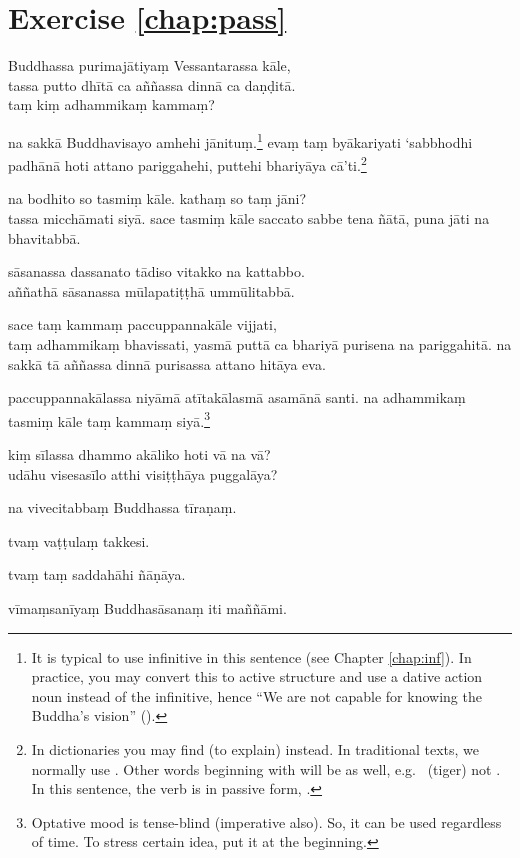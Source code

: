 \section*{Exercise \ref{chap:pass}}
\begin{answerkey}
\item Buddhassa purimaj\=atiya\d m Vessantarassa k\=ale, \\tassa putto dh\=it\=a ca a\~n\~nassa dinn\=a ca da\d n\d dit\=a. \\ta\d m ki\d m adhammika\d m kamma\d m?
\item na sakk\=a Buddhavisayo amhehi j\=anitu\d m.\footnote{It is typical to use infinitive in this sentence (see Chapter \ref{chap:inf}). In practice, you may convert this to active structure and use a dative action noun instead of the infinitive, hence ``We are not capable for knowing the Buddha's vision'' ().} eva\d m ta\d m by\=akariyati `sabbhodhi padh\=an\=a hoti attano pariggahehi, puttehi bhariy\=aya c\=a'ti.\footnote{In dictionaries you may find  (to explain) instead. In traditional texts, we normally use . Other words beginning with  will be  as well, e.g.\  (tiger) not . In this sentence, the verb is in passive form, .}
\item na bodhito so tasmi\d m k\=ale. katha\d m so ta\d m j\=ani? \\tassa micch\=amati siy\=a. sace tasmi\d m k\=ale saccato sabbe tena \~n\=at\=a, puna j\=ati na bhavitabb\=a.
\item s\=asanassa dassanato t\=adiso vitakko na kattabbo. \\a\~n\~nath\=a s\=asanassa m\=ulapati\d t\d th\=a umm\=ulitabb\=a.
\item sace ta\d m kamma\d m paccuppannak\=ale vijjati, \\ta\d m adhammika\d m bhavissati, yasm\=a putt\=a ca bhariy\=a puri\-sena na pariggahit\=a. na sakk\=a t\=a a\~n\~nassa dinn\=a purisassa attano hit\=aya eva.
\item paccuppannak\=alassa niy\=am\=a at\=itak\=alasm\=a asam\=an\=a santi. na adhammika\d m tasmi\d m k\=ale ta\d m kamma\d m siy\=a.\footnote{Optative mood is tense-blind (imperative also). So, it can be used regardless of time. To stress certain idea, put it at the beginning.}
\item ki\d m s\=ilassa dhammo ak\=aliko hoti v\=a na v\=a? \\ud\=ahu visesas\=ilo atthi visi\d t\d th\=aya puggal\=aya?
\item na vivecitabba\d m Buddhassa t\=ira\d na\d m.
\item tva\d m va\d t\d tula\d m takkesi.
\item tva\d m ta\d m saddah\=ahi \~n\=a\d n\=aya.
\item v\=ima\d msan\=iya\d m Buddhas\=asana\d m iti ma\~n\~n\=ami.
\end{answerkey}

